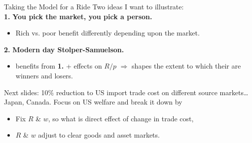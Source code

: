 \documentclass[9pt,pdftex,aspectratio=1610]{beamer}
\theoremstyle{definition}
\begin{document}

\begin{frame}[t]{Taking the Model for a Ride}
\smallskip
Two ideas I want to illustrate:\\
\medskip
\textbf{1.} \textbf{You pick the market, you pick a person.}
\begin{itemize}
  \item Rich vs. poor benefit differently depending upon the market.
\end{itemize}
\bigskip
\textbf{2.} \textbf{Modern day Stolper-Samuelson.}
\begin{itemize}
\item benefits from \textbf{1.} + effects on $R/p$ $\Rightarrow$ shapes the extent to which their are winners and losers.
\end{itemize}
\bigskip
Next slides: 10\% reduction to US import trade cost on different source markets\ldots Japan, Canada. Focus on US welfare and break it down by
\begin{itemize}
\item[A.] Fix $R$ \& $w$, so what is direct effect of change in trade cost,
\smallskip
\item[B.] $R$ \& $w$ adjust to clear goods and asset markets.
\end{itemize}
\end{frame}


\end{document}
